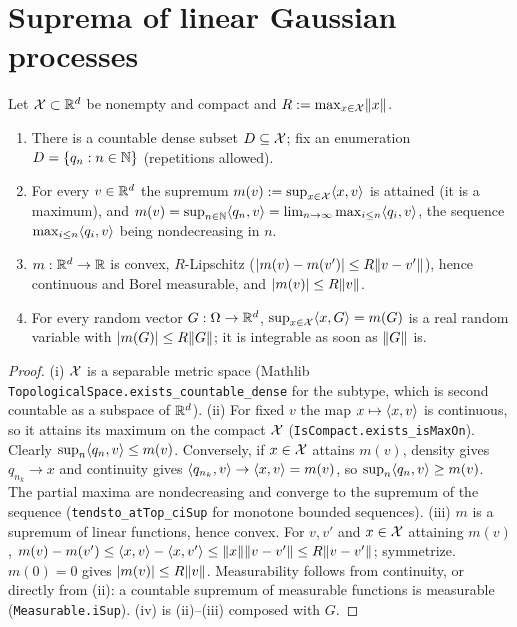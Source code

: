 \section{Suprema of linear Gaussian processes}
\label{sec:pre_gaussian_sup}

\begin{lemma}
\label{lem:sup_countable_dense}
\leanok
Let $\mathcal{X} \subset \mathbb{R}^d$ be nonempty and compact and $R := \max_{x\in\mathcal{X}}\lVert x \rVert$.
\begin{enumerate}
  \item[(i)] There is a countable dense subset $D \subseteq \mathcal{X}$; fix an enumeration
        $D = \{q_n : n \in \mathbb{N}\}$ (repetitions allowed).
  \item[(ii)] For every $v \in \mathbb{R}^d$ the supremum $m(v) := \sup_{x\in\mathcal{X}}\langle x, v \rangle$ is
        attained (it is a maximum), and
        $m(v) = \sup_{n\in\mathbb{N}}\langle q_n, v \rangle = \lim_{n\to\infty}\max_{i\le n}\langle q_i, v \rangle$,
        the sequence $\max_{i\le n}\langle q_i, v \rangle$ being nondecreasing in $n$.
  \item[(iii)] $m : \mathbb{R}^d \to \mathbb{R}$ is convex, $R$-Lipschitz ($\lvert m(v) - m(v') \rvert \le R\lVert v - v' \rVert$),
        hence continuous and Borel measurable, and $\lvert m(v) \rvert \le R\lVert v \rVert$.
  \item[(iv)] For every random vector $G : \Omega \to \mathbb{R}^d$, $\sup_{x\in\mathcal{X}}\langle x, G \rangle = m(G)$ is
        a real random variable with $\lvert m(G) \rvert \le R\lVert G \rVert$; it is integrable as soon as
        $\lVert G \rVert$ is.
\end{enumerate}
\end{lemma}

\begin{proof}
\leanok
(i) $\mathcal{X}$ is a separable metric space (Mathlib \texttt{TopologicalSpace.exists\_countable\_dense}
for the subtype, which is second countable as a subspace of $\mathbb{R}^d$). (ii) For fixed $v$ the
map $x \mapsto \langle x, v \rangle$ is continuous, so it attains its maximum on the compact $\mathcal{X}$
(\texttt{IsCompact.exists\_isMaxOn}). Clearly $\sup_{n}\langle q_n, v \rangle \le m(v)$. Conversely, if
$x \in \mathcal{X}$ attains $m(v)$, density gives $q_{n_k} \to x$ and continuity gives
$\langle q_{n_k}, v \rangle \to \langle x, v \rangle = m(v)$, so $\sup_n\langle q_n, v \rangle \ge m(v)$. The partial maxima are
nondecreasing and converge to the supremum of the sequence
(\texttt{tendsto\_atTop\_ciSup} for monotone bounded sequences). (iii) $m$ is a supremum of
linear functions, hence convex. For $v, v'$ and $x \in \mathcal{X}$ attaining $m(v)$,
$m(v) - m(v') \le \langle x, v \rangle - \langle x, v' \rangle \le \lVert x \rVert\lVert v-v' \rVert \le R\lVert v-v' \rVert$; symmetrize.
$m(0) = 0$ gives $\lvert m(v) \rvert \le R\lVert v \rVert$. Measurability follows from continuity, or
directly from (ii): a countable supremum of measurable functions is measurable
(\texttt{Measurable.iSup}). (iv) is (ii)--(iii) composed with $G$.
\end{proof}

